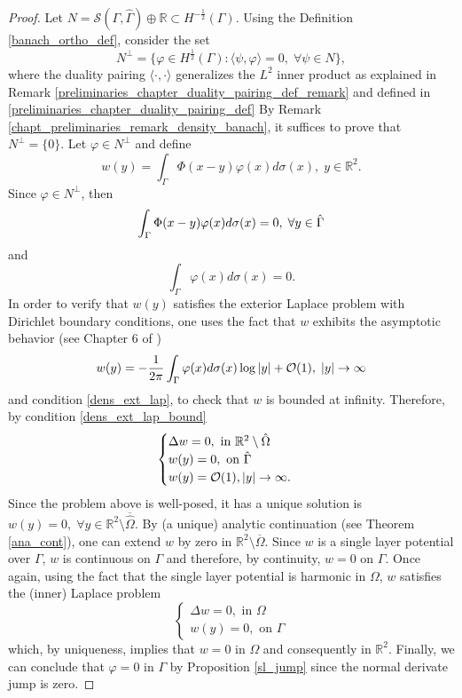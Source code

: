 \begin{proof}
    Let \(N = \mathcal{S}(\Gamma, \hat{\Gamma}) \oplus \mathbb{R} \subset H^{-\frac{1}{2}}(\Gamma)\). Using the Definition \ref{banach_ortho_def}, consider the set
    \[
         N^\perp = \{\varphi \in H^{\frac{1}{2}}(\Gamma): \langle \psi, \varphi \rangle = 0, \; \forall \psi \in N\},
    \]
    where the duality pairing \(\langle \cdot, \cdot \rangle\) generalizes the \(L^2\) inner product as explained in Remark \ref{preliminaries_chapter_duality_pairing_def_remark} and defined in \eqref{preliminaries_chapter_duality_pairing_def} 
    By Remark \ref{chapt_preliminaries_remark_density_banach}, it suffices to prove that \(N^\perp = \{0\}\). Let \(\varphi \in N^\perp\) and define
    \[
        w(y) = \int_\Gamma\Phi(x-y)\varphi(x) d\sigma(x), \; y \in \mathbb{R}^2.
    \]
    Since \(\varphi \in N^\perp\), then
    \begin{equation}\label{dens_ext_lap_bound}
        \int_\Gamma\Phi(x-y)\varphi(x) d\sigma(x) = 0, \; \forall y \in \hat{\Gamma}\\
    \end{equation}
    and
    \begin{equation}\label{dens_ext_lap}
        \int_\Gamma \varphi (x) d\sigma(x) = 0.
    \end{equation}
    In order to verify that \(w(y)\) satisfies the exterior Laplace problem with Dirichlet boundary conditions, one uses the fact that \(w\) exhibits the asymptotic behavior (see Chapter 6 of \cite{kress2013linear})
    \[
        w(y) = -\frac{1}{2 \pi} \int_\Gamma \varphi (x) d\sigma(x) \log \abs{y} + \mathcal{O}(1), \; \abs{y} \rightarrow \infty
    \]
    and condition \eqref{dens_ext_lap}, to check that \(w\) is bounded at infinity. Therefore, by condition \eqref{dens_ext_lap_bound}
    \[
        \begin{cases}
            \Delta w = 0, \text{ in } \mathbb{R}^2\setminus \hat{\Omega}\\
            w(y) = 0, \text{ on } \hat{\Gamma}\\
            w(y) = \mathcal{O}(1), \abs{y} \rightarrow \infty.
        \end{cases}
    \]
    Since the problem above is well-posed, it has a unique solution is \(w(y) = 0, \; \forall y \in \mathbb{R}^2\setminus\overline{\hat{\Omega}}\). By (a unique) analytic continuation (see Theorem \ref{ana_cont}), one can extend \(w\) by zero in \(\mathbb{R}^2\setminus\overline{\Omega}\). Since \(w\) is a single layer potential over \(\Gamma\), \(w\) is continuous on \(\Gamma\) and therefore, by continuity, \(w = 0\) on \(\Gamma\). Once again, using the fact that the single layer potential is harmonic in \(\Omega\), \(w\) satisfies the (inner) Laplace problem
    \[
        \begin{cases}
            \Delta w = 0, \text{ in } \Omega\\
            w(y) = 0, \text{ on } \Gamma
        \end{cases}
    \]
    which, by uniqueness, implies that \(w = 0\) in \(\Omega\) and consequently in \(\mathbb{R}^2\). Finally, we can conclude that \(\varphi = 0\) in \(\Gamma\) by Proposition \ref{sl_jump} since the normal derivate jump is zero.


\end{proof}
